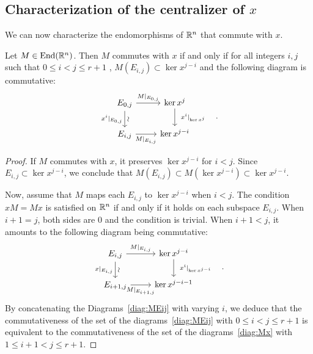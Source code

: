 \documentclass[english]{article}
\begin{document}
\subsection{Characterization of the centralizer of $x$}\label{secno:centralizerx}

We can now characterize the endomorphisms of $\mathbb{R}^n$ that commute with $x$.

\begin{lemma}\label{lm:DiagrammeCommutatifM}
    Let $M\in \operatorname{End}(\mathbb{R}^n)$.
    Then $M$ commutes with $x$ if and only if 
    for all integers $i,j$ such that $0 \leqslant i<j \leqslant r+1$ , $M(E_{i,j}) \subset \ker x^{j-i}$
	and the following diagram is commutative:
	\begin{equation}\label{diag:Mx}
	\begin{tikzcd}
        E_{0,j}
			\ar[d, "x^i|_{E_{0,j}}"', "\sim" sloped]
			\ar[r, "M|_{E_{0,j}}"]
			&
		\ker x^j
			\ar[d, "x^{i}|_{\ker x^{j}}" outer sep=5pt]
		\\
		E_{i,j}
			\ar[r, "M|_{E_{i,j}}"']
			&
		\ker x^{j-i}
	\end{tikzcd}
    \quad.
	\end{equation}
\end{lemma}

\begin{proof}
    If $M$ commutes with $x$, it preserves $\ker x^{j-i}$ for $i<j$. Since $E_{i,j} \subset \ker x^{j-i}$, we conclude that $M(E_{i,j}) \subset M(\ker x^{j-i}) \subset \ker x^{j-i}$.

    Now, assume that $M$ maps each $E_{i,j}$ to $\ker x^{j-i}$ when $i<j$.
    The condition $xM=Mx$ is satisfied on $\mathbb{R}^n$ if and only if it holds on each subspace $E_{i,j}$. When $i+1=j$, both sides are $0$ and the condition is trivial. When $i+1<j$, it amounts to the following diagram being commutative:
	\begin{equation}\label{diag:MEij}
    \begin{tikzcd}
        E_{i,j}
			\ar[d, "x|_{E_{i,j}}"', "\sim" sloped]
			\ar[r, "M|_{E_{i,j}}"]
			&
		\ker x^{j-i}
			\ar[d, "x^{i}|_{\ker x^{j-i}}" outer sep=5pt]
		\\
		E_{i+1,j}
			\ar[r, "M|_{E_{i+1,j}}"']
			&
		\ker x^{j-i-1}
	\end{tikzcd}
    \quad.    
    \end{equation}
    By concatenating the Diagrams~\eqref{diag:MEij} with varying $i$, we deduce that the commutativeness of the set of the diagrams~\eqref{diag:MEij} with $0 \leqslant i < j \leqslant r+1$ is equivalent to the commutativeness of the set of the diagrams~\eqref{diag:Mx} with $1 \leqslant i + 1 < j \leqslant r+1$.
\end{proof}
\end{document}
